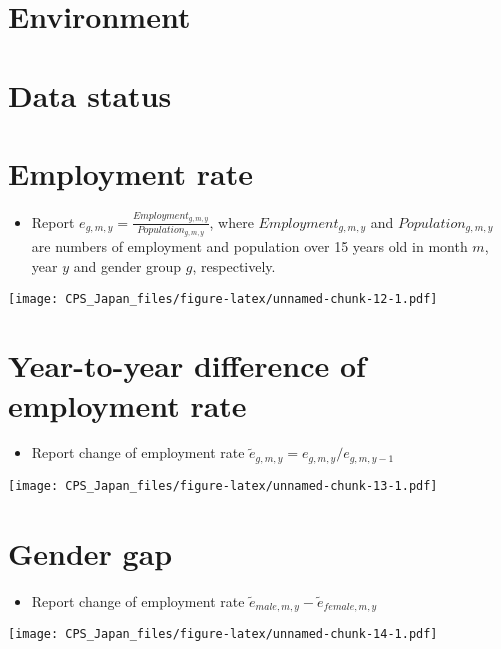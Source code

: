 \documentclass[
]{book}
\providecommand{\tightlist}{%
  \setlength{\itemsep}{0pt}\setlength{\parskip}{0pt}}
\begin{document}
\hypertarget{environment-2}{%
\section{Environment}\label{environment-2}}

\hypertarget{data-status}{%
\section{Data status}\label{data-status}}

\hypertarget{employment-rate-2}{%
\section{Employment rate}\label{employment-rate-2}}

\begin{itemize}
\tightlist
\item
  Report \(e_{g,m,y} = \frac{Employment_{g,m,y}}{Population_{g,m,y}}\), where \(Employment_{g,m,y}\) and \(Population_{g,m,y}\) are numbers of employment and population over 15 years old in month \(m\), year \(y\) and gender group \(g\), respectively.
\end{itemize}

\texttt{[image: CPS\_Japan\_files/figure-latex/unnamed-chunk-12-1.pdf]}

\hypertarget{year-to-year-difference-of-employment-rate-2}{%
\section{Year-to-year difference of employment rate}\label{year-to-year-difference-of-employment-rate-2}}

\begin{itemize}
\tightlist
\item
  Report change of employment rate \(\tilde e_{g,m,y}=e_{g,m,y}/e_{g,m,y-1}\)
\end{itemize}

\texttt{[image: CPS\_Japan\_files/figure-latex/unnamed-chunk-13-1.pdf]}

\hypertarget{gender-gap-2}{%
\section{Gender gap}\label{gender-gap-2}}

\begin{itemize}
\tightlist
\item
  Report change of employment rate \(\tilde e_{male,m,y}-\tilde e_{female,m,y}\)
\end{itemize}

\texttt{[image: CPS\_Japan\_files/figure-latex/unnamed-chunk-14-1.pdf]}

  
\end{document}
